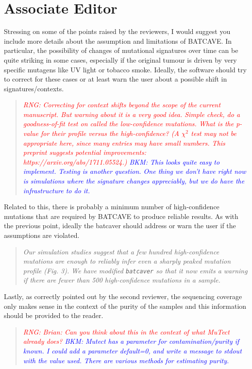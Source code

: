 \documentclass[11pt]{article}
\newcommand{\BKM}[1]{\textcolor{blue}{BKM: #1}}
\newcommand{\RNG}[1]{\textcolor{red}{RNG: #1}}
\newenvironment{response}
{\begin{quote}\itshape}
{\end{quote}}
\begin{document}
\section*{Associate Editor}

Stressing on some of the points raised by the reviewers, I would suggest you include more details about the assumption and limitations of BATCAVE. In particular, the possibility of changes of mutational signatures over time can be quite striking in some cases, especially if the original tumour is driven by very specific mutagens like UV light or tobacco smoke. Ideally, the software should try to correct for these cases or at least warn the user about a possible shift in signatures/contexts.
\begin{response}
\RNG{Correcting for context shifts beyond the scope of the current manuscript. But warning about it is a very good idea. Simple check, do a goodness-of-fit test on called the low-confidence mutations. What is the p-value for their profile versus the high-confidence? (A $\chi^2$ test may not be appropriate here, since many entries may have small numbers. This preprint suggests potential improvements: https://arxiv.org/abs/1711.05524.)}
\BKM{This looks quite easy to implement. Testing is another question. One thing we don't have right now is simulations where the signature changes appreciably, but we do have the infrastructure to do it.}
\end{response}

Related to this, there is probably a minimum number of high-confidence mutations that are required by BATCAVE to produce reliable results. As with the previous point, ideally the batcaver should address or warn the user if the assumptions are violated.
\begin{response}
Our simulation studies suggest that a few hundred high-confidence mutations are enough to reliably infer even a sharply peaked mutation profile (Fig. 3).
We have modified \texttt{batcaver} so that it now emits a warning if there are fewer than 500 high-confidence mutations in a sample.
\end{response}

Lastly, as correctly pointed out by the second reviewer, the sequencing coverage only makes sense in the context of the purity of the samples and this information should be provided to the reader.
\begin{response}
\RNG{Brian: Can you think about this in the context of what MuTect already does?}
\BKM{Mutect has a parameter for contamination/purity if known. I could add a parameter default=0, and write a message to stdout with the value used. There are various methods for estimating purity.}
\end{response}
\end{document}
